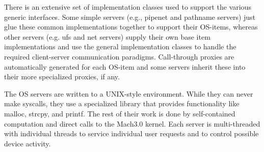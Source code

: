 There is an extensive set of implementation classes used to support the various
generic interfaces.  Some simple servers (e.g., pipenet and pathname servers)
just glue these common implementations together to support their OS-items,
whereas other servers (e.g. ufs and net servers) supply their own
base item implementations and use the general implementation classes to
handle the required client-server communication paradigms.
Call-through proxies are automatically generated for each OS-item and
some servers inherit these into their more specialized proxies, if any.

The OS servers are written to a UNIX-style environment.  While they can
never make syscalls, they use a specialized library that provides functionality
like malloc, strcpy, and printf.  The rest of their work is done by
self-contained computation and direct calls to the Mach3.0 kernel.
Each server is multi-threaded with individual threads to service individual
user requests and to control possible device activity.


